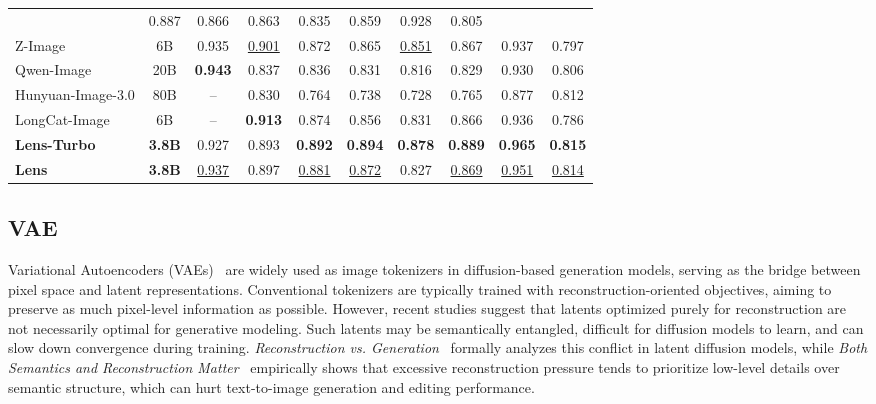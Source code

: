 \begin{table}[t]
{\begin{tabular}{l|c|c|ccccccc}
      & 0.887 & 0.866 & 0.863 & 0.835 & 0.859 & 0.928 & 0.805 \\
    Z-Image & 6B
      & 0.935
      & \underline{0.901} & 0.872 & 0.865 & \underline{0.851} & 0.867 & 0.937 & 0.797 \\
    Qwen-Image & 20B
      & \textbf{0.943}
      & 0.837 & 0.836 & 0.831 & 0.816 & 0.829 & 0.930 & 0.806 \\
    Hunyuan-Image-3.0 & 80B
      & --
      & 0.830 & 0.764 & 0.738 & 0.728 & 0.765 & 0.877 & 0.812 \\
    LongCat-Image & 6B
      & --
      & \textbf{0.913} & 0.874 & 0.856 & 0.831 & 0.866 & 0.936 & 0.786 \\
    \midrule
    \textbf{Lens-Turbo} & \textbf{3.8B}
      & 0.927
      & 0.893 & \textbf{0.892} & \textbf{0.894} & \textbf{0.878} & \textbf{0.889} & \textbf{0.965} & \textbf{0.815} \\
    \textbf{Lens} & \textbf{3.8B}
      & \underline{0.937}
      & 0.897 & \underline{0.881} & \underline{0.872} & 0.827 & \underline{0.869} & \underline{0.951} & \underline{0.814} \\
    \bottomrule
  \end{tabular}%
  }
\end{table}

\subsection{VAE}
Variational Autoencoders (VAEs)~\citep{kingma2013vae} are widely used as image tokenizers in diffusion-based generation models, serving as the bridge between pixel space and latent representations. Conventional tokenizers are typically trained with reconstruction-oriented objectives, aiming to preserve as much pixel-level information as possible. However, recent studies suggest that latents optimized purely for reconstruction are not necessarily optimal for generative modeling. Such latents may be semantically entangled, difficult for diffusion models to learn, and can slow down convergence during training. \textit{Reconstruction vs. Generation}~\citep{liu2024reconstruction} formally analyzes this conflict in latent diffusion models, while \textit{Both Semantics and Reconstruction Matter}~\citep{yang2024both} empirically shows that excessive reconstruction pressure tends to prioritize low-level details over semantic structure, which can hurt text-to-image generation and editing performance.

